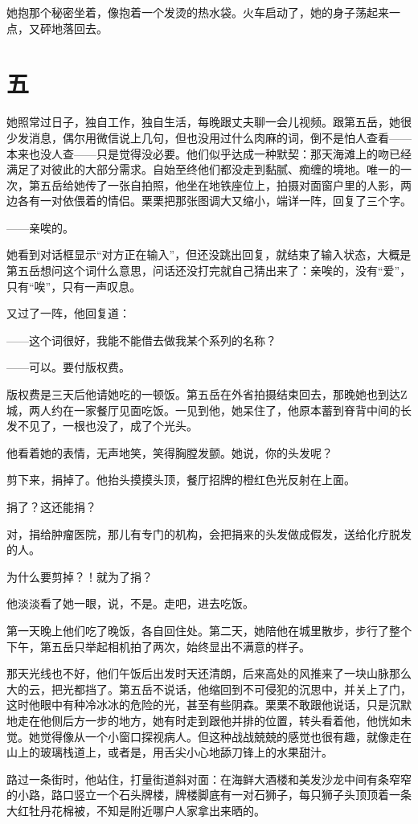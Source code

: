 \documentclass[lang=cn,newtx,12pt,scheme=chinese]{elegantbook}
\begin{document}
她抱那个秘密坐着，像抱着一个发烫的热水袋。火车启动了，她的身子荡起来一点，又砰地落回去。
\section{五}
她照常过日子，独自工作，独自生活，每晚跟丈夫聊一会儿视频。跟第五岳，她很少发消息，偶尔用微信说上几句，但也没用过什么肉麻的词，倒不是怕人查看——本来也没人查——只是觉得没必要。他们似乎达成一种默契：那天海滩上的吻已经满足了对彼此的大部分需求。自始至终他们都没走到黏腻、痴缠的境地。唯一的一次，第五岳给她传了一张自拍照，他坐在地铁座位上，拍摄对面窗户里的人影，两边各有一对依偎着的情侣。栗栗把那张图调大又缩小，端详一阵，回复了三个字。

——亲唉的。

她看到对话框显示“对方正在输入”，但还没跳出回复，就结束了输入状态，大概是第五岳想问这个词什么意思，问话还没打完就自己猜出来了：亲唉的，没有“爱”，只有“唉”，只有一声叹息。

又过了一阵，他回复道：

——这个词很好，我能不能借去做我某个系列的名称？

——可以。要付版权费。

版权费是三天后他请她吃的一顿饭。第五岳在外省拍摄结束回去，那晚她也到达Z城，两人约在一家餐厅见面吃饭。一见到他，她呆住了，他原本蓄到脊背中间的长发不见了，一根也没了，成了个光头。

他看着她的表情，无声地笑，笑得胸膛发颤。她说，你的头发呢？

剪下来，捐掉了。他抬头摸摸头顶，餐厅招牌的橙红色光反射在上面。

捐了？这还能捐？

对，捐给肿瘤医院，那儿有专门的机构，会把捐来的头发做成假发，送给化疗脱发的人。

为什么要剪掉？！就为了捐？

他淡淡看了她一眼，说，不是。走吧，进去吃饭。

第一天晚上他们吃了晚饭，各自回住处。第二天，她陪他在城里散步，步行了整个下午，第五岳只举起相机拍了两次，始终显出不满意的样子。

那天光线也不好，他们午饭后出发时天还清朗，后来高处的风推来了一块山脉那么大的云，把光都挡了。第五岳不说话，他缩回到不可侵犯的沉思中，并关上了门，这时他眼中有种冷冰冰的危险的光，甚至有些阴森。栗栗不敢跟他说话，只是沉默地走在他侧后方一步的地方，她有时走到跟他并排的位置，转头看着他，他恍如未觉。她觉得像从一个小窗口探视病人。但这种战战兢兢的感觉也很有趣，就像走在山上的玻璃栈道上，或者是，用舌尖小心地舔刀锋上的水果甜汁。

路过一条街时，他站住，打量街道斜对面：在海鲜大酒楼和美发沙龙中间有条窄窄的小路，路口竖立一个石头牌楼，牌楼脚底有一对石狮子，每只狮子头顶顶着一条大红牡丹花棉被，不知是附近哪户人家拿出来晒的。
\end{document}
